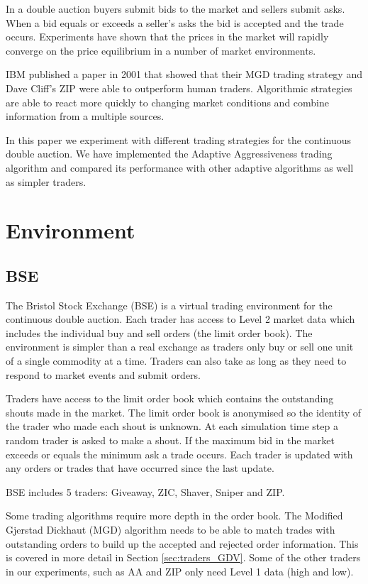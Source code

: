 \documentclass{acm_proc_article-sp}
\begin{document}
In a double auction buyers submit bids to the market and sellers submit asks.
When a bid equals or exceeds a seller's asks the bid is accepted and the trade
occurs. Experiments have shown  that the prices in the market will
rapidly converge on the price equilibrium in a number of market
environments\cite{smith_1962}.

IBM published a paper in 2001 that showed that their MGD trading strategy and
Dave Cliff's ZIP were able to outperform human traders\cite{ibm_human}.
Algorithmic strategies are able to react more quickly to changing market
conditions and combine information from a multiple sources.

In this paper we experiment with different trading strategies for the
continuous double auction.
We have implemented the Adaptive Aggressiveness\cite{AA_thesis} trading
algorithm and compared its performance with other adaptive algorithms as well
as simpler traders.\\


\section{Environment} \label{sec:environment}
\subsection{BSE} \label{sec:BSE}
The Bristol Stock Exchange (BSE) is a virtual trading environment for the
continuous double auction. Each trader has access to Level 2 market data which
includes the individual buy and sell orders (the limit order book). The
environment is simpler than a real exchange as traders only buy or sell one
unit of a single commodity at a time. Traders can also take as long as they
need to respond to market events and submit orders.

Traders have access to the limit order book which contains the outstanding
shouts made in the market. The limit order book is anonymised so the identity
of the trader who made each shout is unknown. At each simulation time step a
random trader is asked to make a shout. If the maximum bid in the market
exceeds or equals the minimum ask a trade occurs. Each trader is updated with
any orders or trades that have occurred since the last update.

BSE includes 5 traders: Giveaway, ZIC, Shaver, Sniper and ZIP.

Some trading algorithms require more depth in the order book. The Modified
Gjerstad Dickhaut (MGD) algorithm needs to be able to match trades with
outstanding orders to build up the accepted and rejected order information.
This is covered in more detail in Section \ref{sec:traders_GDV}. Some of the
other traders in our experiments, such as AA and ZIP only need Level 1 data
(high and low).
\end{document}
